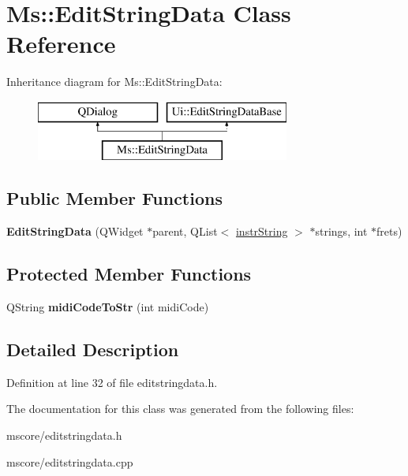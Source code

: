\hypertarget{class_ms_1_1_edit_string_data}{}\section{Ms\+:\+:Edit\+String\+Data Class Reference}
\label{class_ms_1_1_edit_string_data}
Inheritance diagram for Ms\+:\+:Edit\+String\+Data\+:\begin{figure}[H]
\begin{center}
\leavevmode
\includegraphics[height=2.000000cm]{class_ms_1_1_edit_string_data}
\end{center}
\end{figure}
\subsection*{Public Member Functions}
\begin{DoxyCompactItemize}
\item 
\mbox{\label{class_ms_1_1_edit_string_data_a9602b9e4bba4a5f2ee8f22436a0276ac}} 
{\bfseries Edit\+String\+Data} (Q\+Widget $\ast$parent, Q\+List$<$ \hyperlink{struct_ms_1_1instr_string}{instr\+String} $>$ $\ast$strings, int $\ast$frets)
\end{DoxyCompactItemize}
\subsection*{Protected Member Functions}
\begin{DoxyCompactItemize}
\item 
\mbox{\label{class_ms_1_1_edit_string_data_a32ab1002b8453035b5d38683ae078ac0}} 
Q\+String {\bfseries midi\+Code\+To\+Str} (int midi\+Code)
\end{DoxyCompactItemize}


\subsection{Detailed Description}


Definition at line 32 of file editstringdata.\+h.



The documentation for this class was generated from the following files\+:\begin{DoxyCompactItemize}
\item 
mscore/editstringdata.\+h\item 
mscore/editstringdata.\+cpp\end{DoxyCompactItemize}
